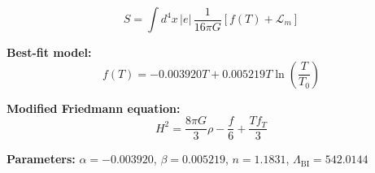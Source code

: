 
\begin{equation}
  S = \int d^4x \, |e| \, \frac{1}{16\pi G} \left[ f(T) + \mathcal{L}_m \right]
\end{equation}

\textbf{Best-fit model:}
\begin{equation}
  f(T) = -0.003920 T + 0.005219 T \ln\!\left(\frac{T}{T_0}\right)
\end{equation}

\textbf{Modified Friedmann equation:}
\begin{equation}
  H^2 = \frac{8\pi G}{3} \rho - \frac{f}{6} + \frac{T f_T}{3}
\end{equation}

\textbf{Parameters:}
$\alpha = -0.003920$, \quad
$\beta = 0.005219$, \quad
$n = 1.1831$, \quad
$\Lambda_{\text{BI}} = 542.0144$
